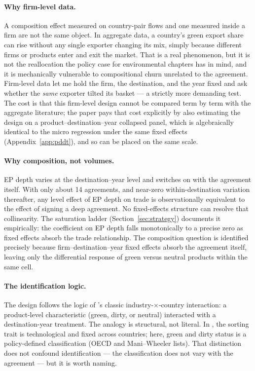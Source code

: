 \documentclass[12pt]{article}
\begin{document}
\paragraph{Why firm-level data.}
A composition effect measured on country-pair flows and one measured inside a firm are
not the same object. In aggregate data, a country's green export share can rise without
any single exporter changing its mix, simply because different firms or products enter and
exit the market. That is a real phenomenon, but it is not the reallocation the policy
case for environmental chapters has in mind, and it is mechanically vulnerable to
compositional churn unrelated to the agreement. Firm-level data let me hold the firm,
the destination, and the year fixed and ask whether the \emph{same} exporter tilted its
basket --- a strictly more demanding test. The cost is that this firm-level design cannot
be compared term by term with the aggregate literature; the paper pays that cost
explicitly by also estimating the design on a product--destination--year collapsed panel,
which is algebraically identical to the micro regression under the same fixed effects
(Appendix~\ref{app:pddt}), and so can be placed on the same scale.

\paragraph{Why composition, not volumes.}
EP depth varies at the destination--year level and switches on with the agreement itself.
With only about 14 agreements, and near-zero within-destination variation thereafter, any
level effect of EP depth on trade is observationally equivalent to the effect of signing
a deep agreement. No fixed-effects structure can resolve that collinearity. The
saturation ladder (Section~\ref{sec:strategy}) documents it empirically: the coefficient
on EP depth falls monotonically to a precise zero as fixed effects absorb the trade
relationship. The composition question is identified precisely because firm--destination--year
fixed effects absorb the agreement itself, leaving only the differential response of green
versus neutral products within the same cell.

\paragraph{The identification logic.}
The design follows the logic of \citet{rajan1998}'s classic industry-$\times$-country
interaction: a product-level characteristic (green, dirty, or neutral) interacted with a
destination-year treatment. The analogy is structural, not literal. In
\citeauthor{rajan1998}, the sorting trait is technological and fixed across countries;
here, green and dirty status is a policy-defined classification (OECD and Mani--Wheeler
lists). That distinction does not confound identification --- the classification does not
vary with the agreement --- but it is worth naming.
\end{document}

